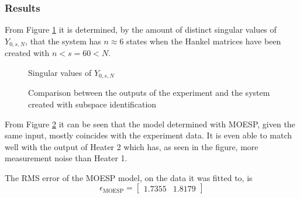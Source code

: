 \subsubsection{Results}
From Figure \ref{fig:SingularY0sN} it is determined, by the amount of distinct singular values of $Y_{0,s,N}$, that the system has $n \approx 6$ states when the Hankel matrices have been created with $n < s = 60 < N$.
\begin{figure}[ht]
    \centering
    
    \caption{Singular values of $Y_{0,s,N}$}
    \label{fig:SingularY0sN}
\end{figure}
\begin{figure}[ht]
    \centering
    
    \caption{Comparison between the outputs of the experiment and the system created with subspace identification}
    \label{fig:Comp_subID}
\end{figure}
From Figure \ref{fig:Comp_subID} it can be seen that the model determined with MOESP, given the same input, mostly coincides with the experiment data. It is even able to match well with the output of Heater 2 which has, as seen in the figure, more measurement noise than Heater 1.

The RMS error of the MOESP model, on the data it was fitted to, is
$$
\epsilon_{\text{MOESP}} = \begin{bmatrix} 1.7355 & 1.8179\end{bmatrix}
$$
